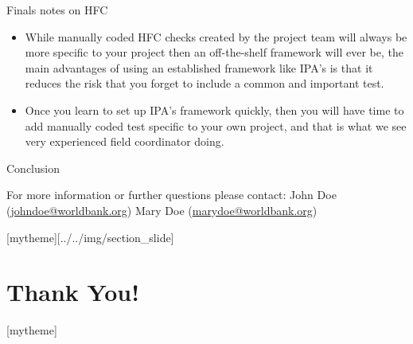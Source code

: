 \documentclass[aspectratio=169]{beamer}
\newcommand{\sectionpic}[2]{
	\setbeamertemplate{section page}[mytheme][#2]
	\section{#1}
	\setbeamertemplate{section page}[mytheme]
}
\begin{document}
\begin{frame}{Finals notes on HFC}
	\begin{itemize}
		\item While manually coded HFC checks created by the project team will always be more specific to your project then an off-the-shelf framework will ever be, the main advantages of using an established framework like IPA's is that it reduces the risk that you forget to include a common and important test.
		\item Once you learn to set up IPA's framework quickly, then you will have time to add manually coded test specific to your own project, and that is what we see very experienced field coordinator doing.
	\end{itemize}
\end{frame}

\begin{frame}{Conclusion}


\vspace{20mm}
For more information or further questions please contact:
\newline John Doe (\url{johndoe@worldbank.org}) \newline Mary Doe (\url{marydoe@worldbank.org})

\end{frame}

\sectionpic{Thank You!}{../../img/section_slide}
\end{document}
